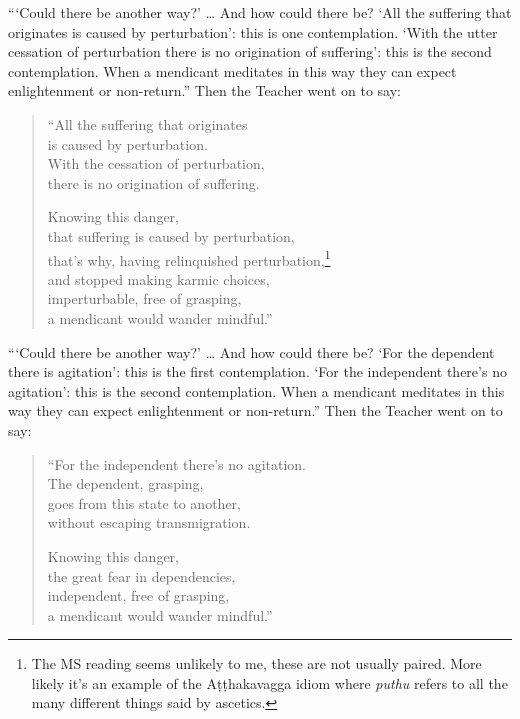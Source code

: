 \documentclass[12pt,openany]{book}%
\begin{document}
“‘Could there be another way?’ … And how could there be? ‘All the suffering that originates is caused by perturbation’: this is one contemplation. ‘With the utter cessation of perturbation there is no origination of suffering’: this is the second contemplation. When a mendicant meditates in this way they can expect enlightenment or non-return.” Then the Teacher went on to say: 

\begin{verse}%
“All the suffering that originates \\
is caused by perturbation. \\
With the cessation of perturbation, \\
there is no origination of suffering. 

Knowing this danger, \\
that suffering is caused by perturbation, \\
that’s why, having relinquished perturbation,\footnote{The MS reading seems unlikely to me, these are not usually paired. More likely it’s an example of the \textsanskrit{Aṭṭhakavagga} idiom where \textit{puthu} refers to all the many different things said by ascetics. } \\
and stopped making karmic choices, \\
imperturbable, free of grasping, \\
a mendicant would wander mindful.” 

%
\end{verse}

“‘Could there be another way?’ … And how could there be? ‘For the dependent there is agitation’: this is the first contemplation. ‘For the independent there’s no agitation’: this is the second contemplation. When a mendicant meditates in this way they can expect enlightenment or non-return.” Then the Teacher went on to say: 

\begin{verse}%
“For the independent there’s no agitation. \\
The dependent, grasping, \\
goes from this state to another, \\
without escaping transmigration. 

Knowing this danger, \\
the great fear in dependencies, \\
independent, free of grasping, \\
a mendicant would wander mindful.” 

%
\end{verse}
\end{document}
